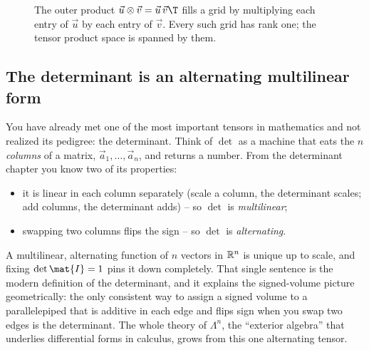 \begin{figure}[H]
\centering
{}
\caption{The outer product $\vec{u}\otimes\vec{v} = \vec{u}\,\vec{v}\T$ fills a grid
by multiplying each entry of $\vec{u}$ by each entry of $\vec{v}$. Every such grid
has rank one; the tensor product space is spanned by them.}
\label{ch37:fig-outer}
\end{figure}

\subsection{The determinant is an alternating multilinear form}
\label{ch37:det-tensor}

You have already met one of the most important tensors in mathematics and not
realized its pedigree: the determinant. Think of $\det$ as a machine that eats the
$n$ \emph{columns} of a matrix, $\vec{a}_1,\dots,\vec{a}_n$, and returns a number.
From the determinant chapter you know two of its properties:
\begin{itemize}
  \item it is linear in each column separately (scale a column, the determinant
        scales; add columns, the determinant adds) -- so $\det$ is
        \emph{multilinear};
  \item swapping two columns flips the sign -- so $\det$ is \emph{alternating}.
\end{itemize}
A multilinear, alternating function of $n$ vectors in $\mathbb{R}^n$ is unique up to scale,
and fixing $\det\mat{I}=1$ pins it down completely. That single sentence is the
modern definition of the determinant, and it explains the signed-volume picture
geometrically: the only consistent way to assign a signed volume to a parallelepiped
that is additive in each edge and flips sign when you swap two edges is the
determinant. The whole theory of $\Lambda^n$, the ``exterior algebra'' that
underlies differential forms in calculus, grows from this one alternating tensor.


